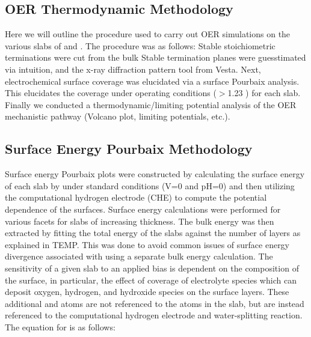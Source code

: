 \subsection{OER Thermodynamic Methodology}  %
%
%
Here we will outline the procedure used to carry out OER simulations on the various slabs of \IrOtwo and \IrOthree.
%
The procedure was as follows:
%
Stable stoichiometric terminations were cut from the bulk
%
Stable termination planes were guesstimated via intuition, and the x-ray diffraction pattern tool from Vesta.
%
Next, electrochemical surface coverage was elucidated via a surface Pourbaix analysis.
%
This elucidates the coverage under operating conditions ($>$\num{1.23} \VRHE) for each slab.
%
Finally we conducted a thermodynamic/limiting potential analysis of the OER mechanistic pathway (Volcano plot, limiting potentials, etc.).


\subsection{Surface Energy Pourbaix Methodology}  %
%
%
Surface energy Pourbaix plots were constructed by calculating the surface energy of each slab by under standard conditions (\si{\volt}\num{=0} and pH\num{=0}) and then utilizing the computational hydrogen electrode (CHE) to compute the potential dependence of the surfaces.
%
Surface energy calculations were performed for various facets for slabs of increasing thickness.
%
The bulk energy was then extracted by fitting the total energy of the slabs against the number of layers as explained in TEMP.
%
This was  done to avoid common issues of surface energy divergence associated with using a separate bulk energy calculation.
%
The sensitivity of a given slab to an applied bias is dependent on the composition of the surface,
in particular, the effect of coverage of electrolyte species which can deposit oxygen, hydrogen, and hydroxide species on the surface layers.
%
These additional  and  atoms are not referenced to the atoms in the slab, but are instead referenced to the computational hydrogen electrode and water-splitting reaction.
%
The equation for is as follows:


